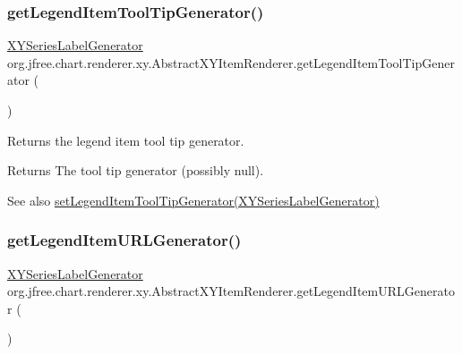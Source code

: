 \subsubsection{\texorpdfstring{get\+Legend\+Item\+Tool\+Tip\+Generator()}{getLegendItemToolTipGenerator()}}
{\footnotesize\ttfamily \mbox{\hyperlink{interfaceorg_1_1jfree_1_1chart_1_1labels_1_1_x_y_series_label_generator}{X\+Y\+Series\+Label\+Generator}} org.\+jfree.\+chart.\+renderer.\+xy.\+Abstract\+X\+Y\+Item\+Renderer.\+get\+Legend\+Item\+Tool\+Tip\+Generator (\begin{DoxyParamCaption}{ }\end{DoxyParamCaption})}

Returns the legend item tool tip generator.

\begin{DoxyReturn}{Returns}
The tool tip generator (possibly {\ttfamily null}).
\end{DoxyReturn}
\begin{DoxySeeAlso}{See also}
\mbox{\hyperlink{classorg_1_1jfree_1_1chart_1_1renderer_1_1xy_1_1_abstract_x_y_item_renderer_ab04c5790c9f85263421e49fd9359b98a}{set\+Legend\+Item\+Tool\+Tip\+Generator(\+X\+Y\+Series\+Label\+Generator)}} 
\end{DoxySeeAlso}
\mbox{\label{classorg_1_1jfree_1_1chart_1_1renderer_1_1xy_1_1_abstract_x_y_item_renderer_a61559d4682c3b11772aef0668dd9e982}} 
\subsubsection{\texorpdfstring{get\+Legend\+Item\+U\+R\+L\+Generator()}{getLegendItemURLGenerator()}}
{\footnotesize\ttfamily \mbox{\hyperlink{interfaceorg_1_1jfree_1_1chart_1_1labels_1_1_x_y_series_label_generator}{X\+Y\+Series\+Label\+Generator}} org.\+jfree.\+chart.\+renderer.\+xy.\+Abstract\+X\+Y\+Item\+Renderer.\+get\+Legend\+Item\+U\+R\+L\+Generator (\begin{DoxyParamCaption}{ }\end{DoxyParamCaption})}

